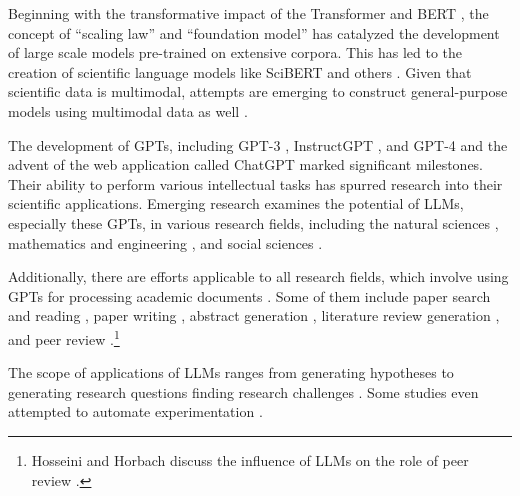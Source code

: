 \documentclass{article}
\begin{document}
Beginning with the transformative impact of the Transformer \cite{vaswani2017attention} and BERT \cite{devlin2018bert}, the concept of ``scaling law'' \cite{kaplan2020scaling} and ``foundation model'' \cite{bommasani2021opportunities} has catalyzed the development of large scale models pre-trained on extensive corpora. This has led to the creation of scientific language models like SciBERT \cite{beltagy2019scibert} and others \cite{cohan2020specter,singh2022scirepeval,nadkarni2021scientific,gupta2022matscibert,taylor2022galactica,azerbayev2023llemma,xie2023darwin,luo2022biogpt,yang2022gatortron,deng2023learning}. Given that scientific data is multimodal, attempts are emerging to construct general-purpose models using multimodal data as well \cite{li2023llava,tu2023towards,takeda2023foundation,nguyen2023climax}.

The development of GPTs, including GPT-3 \cite{brown2020language}, InstructGPT \cite{ouyang2022training}, and GPT-4 \cite{GPT4} and the advent of the web application called ChatGPT  \cite{ChatGPT} marked significant milestones. Their ability to perform various intellectual tasks has spurred research into their scientific applications. Emerging research examines the potential of LLMs, especially these GPTs, in various research fields, including the natural sciences \cite{ai4science2023impact,boiko2023emergent,qin2023gpt,bran2023chemcrow,white2022large,hatakeyama2023prompt,jablonka202314,guo2023can,zheng2023large,qian2023can,wysocka2023large,nori2023capabilities,wang2023large,singhal2023large}, mathematics and engineering \cite{bordt2023chatgpt,wu2023empirical,pursnani2023performance,zheng2023can,zhang2023automl,vijay2023prompt}, and social sciences \cite{koneru2023can,wang2023survey,bail2023can,ziems2023can,park2023generative,horton2023large,korinek2023generative,aher2023using}.

Additionally, there are efforts applicable to all research fields, which involve using GPTs for processing academic documents \cite{alzaabi2023chatgpt}. Some of them include paper search and reading \cite{elicit,scispace}, paper writing \cite{transformer2022can}, abstract generation \cite{gao2023comparing}, literature review generation \cite{aydin2022openai}, and peer review \cite{wexin2023can,liu2023reviewergpt,robertson2023gpt4}.\footnote{
Hosseini and Horbach discuss the influence of LLMs on the role of peer review \cite{hosseini2023fighting}.
}

The scope of applications of LLMs ranges from generating hypotheses to generating research questions finding research challenges \cite{liu2023creative,oppenlaender2023mapping,lahat2023evaluating}. Some studies even attempted to automate experimentation \cite{boiko2023emergent,qin2023gpt}. 
\end{document}
